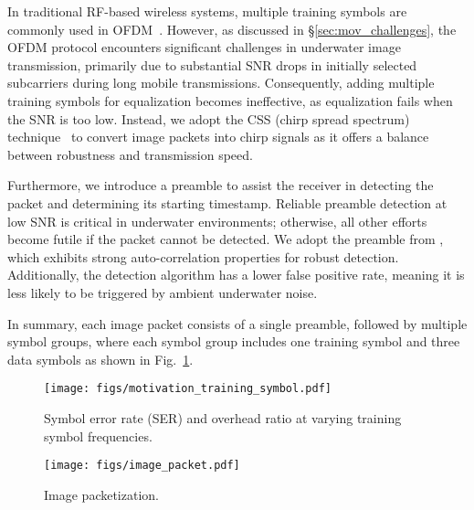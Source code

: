 In traditional RF-based wireless systems, multiple training symbols are commonly used in OFDM~\cite{3GPP}. However, as discussed in \S\ref{sec:mov_challenges},
the OFDM protocol encounters significant challenges in underwater image transmission,
primarily due to substantial SNR drops in initially selected subcarriers
during long mobile transmissions.
Consequently, adding multiple training symbols for equalization becomes ineffective,
as equalization fails when the SNR is too low.
Instead, we adopt the CSS (chirp spread spectrum) technique~\cite{xie2024icc,jia2022two,steinmetz2018practical,steinmetz2022taking,TSN23} to convert image packets into chirp signals
as it offers a balance between robustness and transmission speed.

Furthermore, we introduce a preamble to assist the receiver in detecting
the packet and determining its starting timestamp.
Reliable preamble detection at low SNR is critical in underwater environments;
otherwise, all other efforts become futile if the packet cannot be detected.
We adopt the preamble from \cite{chen2022underwater}, which exhibits strong
auto-correlation properties for robust detection.
Additionally, the detection algorithm has a lower false positive rate,
meaning it is less likely to be triggered by ambient underwater noise.

In summary,
each image packet consists of a single preamble, followed by multiple symbol groups,
where each symbol group includes one training symbol and three data symbols as shown in Fig.~\ref{fig:image_packet}.


\begin{figure}[t]
    \centering
    \begin{minipage}[h]{0.26\textwidth}
        \centering
    \texttt{[image: figs/motivation\_training\_symbol.pdf]}
    \vspace{-12pt}
    \caption{Symbol error rate (SER) and overhead ratio at
    varying training symbol frequencies.}
\label{fig:motiv_multi_training_symbols}
    \end{minipage}
    \hfill
    \begin{minipage}[h]{0.2\textwidth}
        \centering
    \texttt{[image: figs/image\_packet.pdf]}
   \vspace{-8pt}
    \caption{Image packetization.}
    \label{fig:image_packet}
    \end{minipage}
\end{figure}

